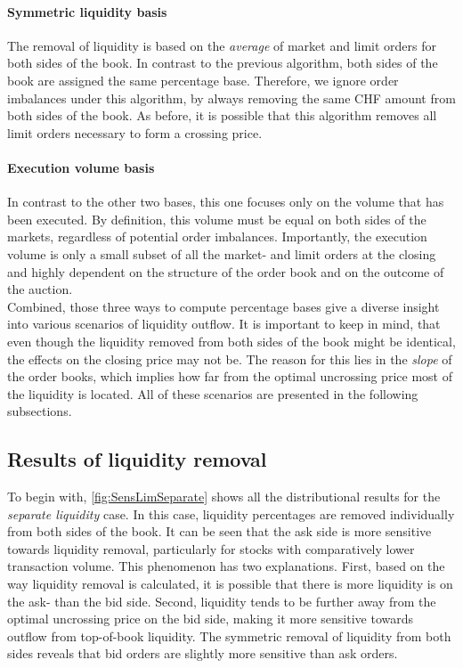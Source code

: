 \documentclass[11pt,a4paper, notitlepage]{article}
\begin{document}
	\paragraph{Symmetric liquidity basis}
	The removal of liquidity is based on the \emph{average} of market and limit orders for both sides of the book. In contrast to the previous algorithm, both sides of the book are assigned the same percentage base. Therefore, we ignore order imbalances under this algorithm, by always removing the same CHF amount from both sides of the book. As before, it is possible that this algorithm removes all limit orders necessary to form a crossing price.
	
	\paragraph{Execution volume basis}
	In contrast to the other two bases, this one focuses only on the volume that has been executed. By definition, this volume must be equal on both sides of the markets, regardless of potential order imbalances. Importantly, the execution volume is only a small subset of all the market- and limit orders at the closing and highly dependent on the structure of the order book and on the outcome of the auction.  \\
	
	Combined, those three ways to compute percentage bases give a diverse insight into various scenarios of liquidity outflow. It is important to keep in mind, that even though the liquidity removed from both sides of the book might be identical, the effects on the closing price may not be. The reason for this lies in the \emph{slope} of the order books, which implies how far from the optimal uncrossing price most of the liquidity is located. All of these scenarios are presented in the following subsections.
	
	\subsection{Results of liquidity removal} \label{subsec:results-of-liquidity-removal}
	
	To begin with, \cref{fig:SensLimSeparate} shows all the distributional results for the \emph{separate liquidity} case. In this case, liquidity percentages are removed individually from both sides of the book. It can be seen that the ask side is more sensitive towards liquidity removal, particularly for stocks with comparatively lower transaction volume. This phenomenon has two explanations. First, based on the way liquidity removal is calculated, it is possible that there is more liquidity is on the ask- than the bid side. Second, liquidity tends to be further away from the optimal uncrossing price on the bid side, making it more sensitive towards outflow from top-of-book liquidity. The symmetric removal of liquidity from both sides reveals that bid orders are slightly more sensitive than ask orders.
	
\end{document}
